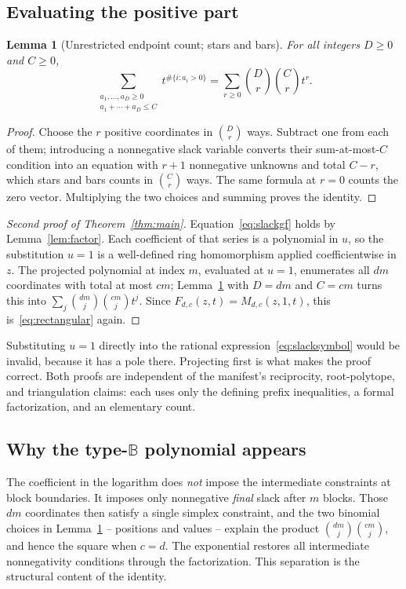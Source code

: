 \documentclass[11pt]{article}
\numberwithin{equation}{section}
\newtheorem{lemma}[theorem]{Lemma}
\theoremstyle{definition}
\begin{document}
\subsection{Evaluating the positive part}
\begin{lemma}[Unrestricted endpoint count; stars and bars]
\label{lem:starsbars}
For all integers $D\geq0$ and $C\geq0$,
\begin{equation}
 \sum_{\substack{a_1,\ldots,a_D\geq0\\ a_1+\cdots+a_D\leq C}}
   t^{\#\{i:a_i>0\}}
 =\sum_{r\geq0}\binom{D}{r}\binom{C}{r}t^r .
 \label{eq:unrestricted}
\end{equation}
\end{lemma}
\begin{proof}
Choose the $r$ positive coordinates in $\binom Dr$ ways. Subtract one from
each of them; introducing a nonnegative slack variable converts their
sum-at-most-$C$ condition into an equation with $r+1$ nonnegative unknowns and
total $C-r$, which stars and bars counts in $\binom{C}{r}$ ways. The same
formula at $r=0$ counts the zero vector. Multiplying the two choices and
summing proves the identity.
\end{proof}

\begin{proof}[Second proof of Theorem~\ref{thm:main}]
Equation~\eqref{eq:slackgf} holds by Lemma~\ref{lem:factor}. Each coefficient
of that series is a polynomial in $u$, so the substitution $u=1$ is a
well-defined ring homomorphism applied coefficientwise in $z$. The projected
polynomial at index $m$, evaluated at $u=1$, enumerates all $dm$ coordinates
with total at most $cm$; Lemma~\ref{lem:starsbars} with $D=dm$ and $C=cm$
turns this into $\sum_j\binom{dm}{j}\binom{cm}{j}t^j$. Since
$F_{d,c}(z,t)=M_{d,c}(z,1,t)$, this is~\eqref{eq:rectangular} again.
\end{proof}

Substituting $u=1$ directly into the rational
expression~\eqref{eq:slacksymbol} would be invalid, because it has a pole
there. Projecting first is what makes the proof correct. Both proofs are
independent of the manifest's reciprocity, root-polytope, and triangulation
claims: each uses only the defining prefix inequalities, a formal
factorization, and an elementary count.

\subsection{Why the type-\texorpdfstring{$\mathbb B$}{B} polynomial appears}
The coefficient in the logarithm does \emph{not} impose the intermediate
constraints at block boundaries. It imposes only nonnegative \emph{final}
slack after $m$ blocks. Those $dm$ coordinates then satisfy a single simplex
constraint, and the two binomial choices in Lemma~\ref{lem:starsbars} --
positions and values -- explain the product $\binom{dm}{j}\binom{cm}{j}$, and
hence the square when $c=d$. The exponential restores all intermediate
nonnegativity conditions through the factorization. This separation is the
structural content of the identity.
\end{document}
